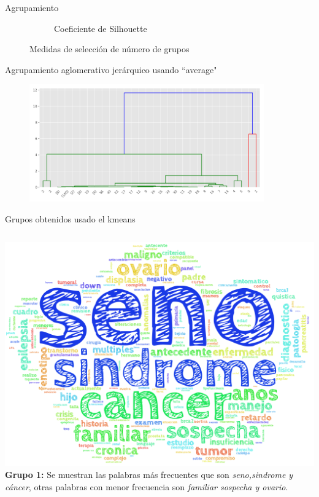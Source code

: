 \documentclass[xcolor=dvipsnames]{beamer}
\begin{document}
\begin{frame}{Agrupamiento}
\begin{figure}
\begin{subfigure}[b]{0.35\textwidth}
			\caption{ Coeficiente de Silhouette}
		\end{subfigure}
		\caption*{Medidas de selección de número de grupos}
	\end{figure}
\end{frame}

\begin{frame}{Agrupamiento aglomerativo jerárquico usando ``average"}
 \begin{figure}[H]
		\centering
		\includegraphics[width=0.9\textwidth]{averagercortado.png}
		\centering
	\end{figure}
\end{frame}

\begin{frame}{Grupos obtenidos usado el kmeans}
\begin{columns}
             \centering
             \includegraphics[width=1\textwidth]{cluster1.png}
           \justifying
              \textbf{Grupo 1:} Se muestran las palabras más frecuentes que son \textit{seno,sindrome y cáncer}, otras palabras con menor frecuencia son \textit{familiar sospecha y ovario}.
         \end{columns}
\end{frame}
\end{document}
